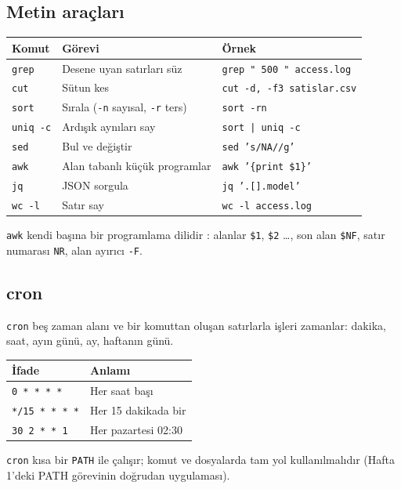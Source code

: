 \documentclass[11pt,a4paper]{article}
\begin{document}
\subsection{Metin araçları}
\begin{center}
\begin{tabularx}{\textwidth}{@{}l Y l@{}}
\toprule
\textbf{Komut} & \textbf{Görevi} & \textbf{Örnek} \\
\midrule
\texttt{grep} & Desene uyan satırları süz & \texttt{grep " 500 " access.log} \\
\texttt{cut} & Sütun kes & \texttt{cut -d, -f3 satislar.csv} \\
\texttt{sort} & Sırala (\texttt{-n} sayısal, \texttt{-r} ters) & \texttt{sort -rn} \\
\texttt{uniq -c} & Ardışık aynıları say & \texttt{sort | uniq -c} \\
\texttt{sed} & Bul ve değiştir & \texttt{sed 's/NA//g'} \\
\texttt{awk} & Alan tabanlı küçük programlar & \texttt{awk '\{print \$1\}'} \\
\texttt{jq} & JSON sorgula & \texttt{jq '.[].model'} \\
\texttt{wc -l} & Satır say & \texttt{wc -l access.log} \\
\bottomrule
\end{tabularx}
\end{center}
\texttt{awk} kendi başına bir programlama dilidir \cite{gawk3}: alanlar \texttt{\$1}, \texttt{\$2} …, son alan \texttt{\$NF}, satır numarası \texttt{NR}, alan ayırıcı \texttt{-F}.

\subsection{cron}
\texttt{cron} beş zaman alanı ve bir komuttan oluşan satırlarla işleri zamanlar: dakika, saat, ayın günü, ay, haftanın günü.
\begin{center}
\begin{tabular}{ll}
\toprule
\textbf{İfade} & \textbf{Anlamı} \\
\midrule
\texttt{0 * * * *} & Her saat başı \\
\texttt{*/15 * * * *} & Her 15 dakikada bir \\
\texttt{30 2 * * 1} & Her pazartesi 02:30 \\
\bottomrule
\end{tabular}
\end{center}
\texttt{cron} kısa bir \texttt{PATH} ile çalışır; komut ve dosyalarda tam yol kullanılmalıdır (Hafta 1'deki PATH görevinin doğrudan uygulaması).
\end{document}
